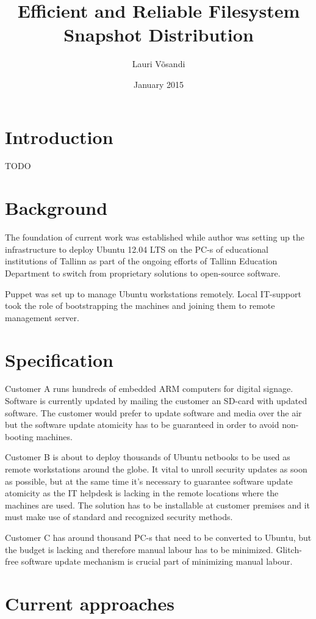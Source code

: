 \documentclass{article}
\title{Efficient and Reliable Filesystem Snapshot Distribution}
\author{Lauri Võsandi}
\date{January 2015}
\begin{document}
\maketitle

\section{Introduction}

TODO

\section{Background}

The foundation of current work was established while author was setting up
the infrastructure to deploy Ubuntu 12.04 LTS on the PC-s of educational
institutions of Tallinn as part of the ongoing efforts of Tallinn Education
Department to switch from proprietary solutions to open-source software.

Puppet was set up to manage Ubuntu workstations remotely. Local IT-support
took the role of bootstrapping the machines and joining them to remote
management server.


\section{Specification}

Customer A runs hundreds of embedded ARM computers for digital signage.
Software is currently updated by mailing the customer an SD-card with
updated software. The customer would prefer to update software and
media over the air but the software update atomicity has to be guaranteed
in order to avoid non-booting machines.

Customer B is about to deploy thousands of Ubuntu netbooks to be used as
remote workstations around the globe. It vital to unroll security updates
as soon as possible, but at the same time it's necessary to guarantee
software update atomicity as the IT helpdesk is lacking in the remote
locations where the machines are used.
The solution has to be installable at customer premises and it
must make use of standard and recognized security methods.

Customer C has around thousand PC-s that need to be converted to Ubuntu,
but the budget is lacking and therefore manual labour has to be minimized.
Glitch-free software update mechanism is crucial part of minimizing manual
labour.

\section{Current approaches}
\end{document}
